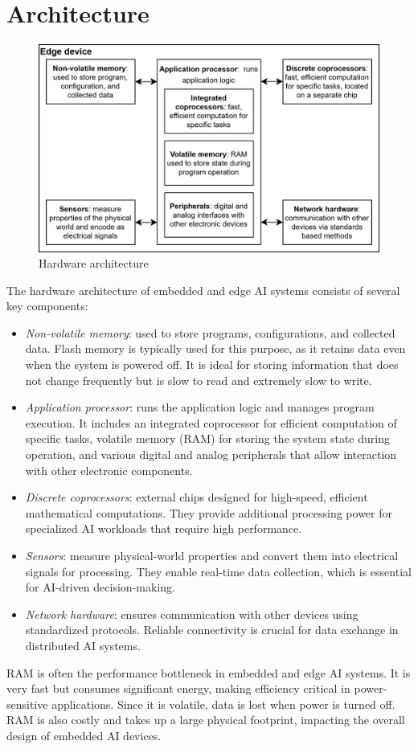 \section{Architecture}

\begin{figure}[H]
    \centering
    \includegraphics[width=0.5\linewidth]{images/eeai4.png}
    \caption{Hardware architecture}
\end{figure}
The hardware architecture of embedded and edge AI systems consists of several key components:
\begin{itemize}
    \item \textit{Non-volatile memory}: used to store programs, configurations, and collected data. 
        Flash memory is typically used for this purpose, as it retains data even when the system is powered off. 
        It is ideal for storing information that does not change frequently but is slow to read and extremely slow to write.
    \item \textit{Application processor}: runs the application logic and manages program execution. 
        It includes an integrated coprocessor for efficient computation of specific tasks, volatile memory (RAM) for storing the system state during operation, and various digital and analog peripherals that allow interaction with other electronic components.
    \item \textit{Discrete coprocessors}: external chips designed for high-speed, efficient mathematical computations. 
        They provide additional processing power for specialized AI workloads that require high performance.
    \item \textit{Sensors}: measure physical-world properties and convert them into electrical signals for processing. 
        They enable real-time data collection, which is essential for AI-driven decision-making.
    \item \textit{Network hardware}:  ensures communication with other devices using standardized protocols.
        Reliable connectivity is crucial for data exchange in distributed AI systems.
\end{itemize}
\noindent RAM is often the performance bottleneck in embedded and edge AI systems. 
It is very fast but consumes significant energy, making efficiency critical in power-sensitive applications.
Since it is volatile, data is lost when power is turned off. 
RAM is also costly and takes up a large physical footprint, impacting the overall design of embedded AI devices.